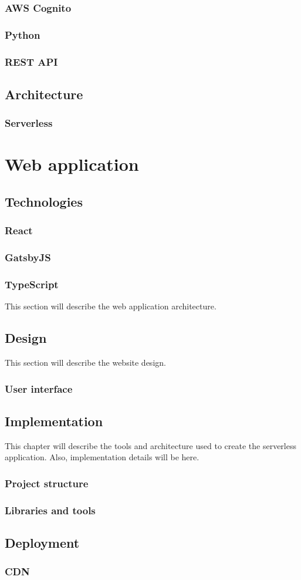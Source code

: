 \documentclass[12pt,oneside]{fithesis2}
\begin{document}
    \subsection{AWS Cognito}
    \subsection{Python}
    \subsection{REST API}
    \section{Architecture}
    \subsection{Serverless}
    \chapter{Web application}
    \section{Technologies}
    \subsection{React}
    \subsection{GatsbyJS}
    \subsection{TypeScript}
    This section will describe the web application architecture.
    \section{Design}
    This section will describe the website design.
    \subsection{User interface}
    \section{Implementation}
    This chapter will describe the tools and architecture used to create the serverless application. Also, implementation details will be here.
    \subsection{Project structure}
    \subsection{Libraries and tools}
    \section{Deployment}
    \subsection{CDN}
    
    
\end{document}
